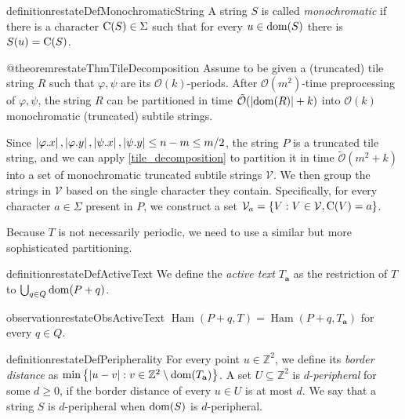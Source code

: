 \documentclass[a4paper,11pt]{article}
\let\Cref\cref
\newcommand{\Z}{\mathbb{Z}}
\renewcommand{\O}{\mathcal{O}}
\newcommand{\tO}{\tilde{\mathcal{O}}}
\newcommand{\V}{\mathcal{V}}
\newcommand{\Ta}{T_\mathbf{a}}
\renewcommand{\phi}{\varphi}
\newcommand{\set}[1]{\left\lbrace #1 \right\rbrace}
\DeclareMathOperator*{\Ham}{Ham}
\newcommand{\absolute}[1]{\left\lvert#1\right\rvert}
\begin{document}
\begin{restatable*}{definition}{restateDefMonochromaticString}
A string $S$ is called \emph{monochromatic} if there is a character $\operatorname*{C}(S) \in \Sigma$ such that for every $u \in \operatorname*{dom}(S)$ there is $S(u) = \operatorname*{C}(S)$.  
\end{restatable*}

\begin{restatable*}{@theorem}{restateThmTileDecomposition}\label{tile_decomposition}
Assume to be given a (truncated) tile string $R$ such that $\phi, \psi$ are its $\O(k)$-periods. After $\O(m^2)$-time preprocessing of $\phi, \psi$, the string $R$ can be partitioned in time $\tO(\absolute{\d{R}} + k)$ into $\O(k)$ monochromatic (truncated) subtile strings.
\end{restatable*}

Since $\absolute{\x{\phi}}, \absolute{\y{\phi}}, \absolute{\x{\psi}}, \absolute{\y{\psi}} \le n - m \le m / 2$, the string $P$ is a truncated tile string, and we can apply \Cref{tile_decomposition} to partition it in time $\tO(m^2 + k)$ into a set of monochromatic truncated subtile strings $\V$. We then group the strings in $\V$ based on the single character they contain. Specifically, for every character $a \in \Sigma$ present in $P$, we construct a set $\V_a = \set{V : V \in \V, \getchar{V} = a}$.

Because $T$ is not necessarily periodic, we need to use a similar but more sophisticated partitioning.

\begin{restatable*}{definition}{restateDefActiveText}
We define the \emph{active text} $\Ta$ as the restriction of $T$ to $\bigcup_{q \in Q} \operatorname*{dom}(P + q)$. 
\end{restatable*}

\begin{restatable*}{observation}{restateObsActiveText}\label{obs:active_text}
$\Ham(P + q, T) = \Ham(P + q, \Ta)$ for every $q \in Q$.
\end{restatable*}

\begin{restatable*}[Peripherality]{definition}{restateDefPeripherality}
For every point $u \in \Z^2$, we define its \emph{border distance} as $\min\set{\absolute{u - v} : v \in \Z^2 \setminus \d{\Ta}}$. A set $U \subseteq \Z^2$ is $d$-\emph{peripheral} for some $d \ge 0$, if the border distance of every $u \in U$ is at most $d$. We say that a string $S$ is $d$-peripheral when $\operatorname*{dom}(S)$ is $d$-peripheral.
\end{restatable*}
\end{document}
